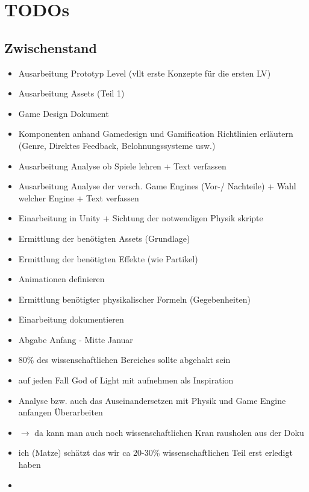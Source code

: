 \section{TODOs}

\subsection{Zwischenstand}
\begin{itemize}
\item Ausarbeitung Prototyp Level (vllt erste Konzepte für die ersten LV)
\item Ausarbeitung Assets (Teil 1)
\item Game Design Dokument
\item Komponenten anhand Gamedesign und Gamification Richtlinien erläutern (Genre, Direktes Feedback, Belohnungssysteme usw.)
\item Ausarbeitung Analyse ob Spiele lehren + Text verfassen
\item Ausarbeitung Analyse der versch. Game Engines (Vor-/ Nachteile) + Wahl welcher Engine + Text verfassen

\item Einarbeitung in Unity + Sichtung der notwendigen Physik skripte
\item \circledmark\quad Ermittlung der benötigten Assets (Grundlage)
\item Ermittlung der benötigten Effekte (wie Partikel)
\item Animationen definieren
\item Ermittlung benötigter physikalischer Formeln (Gegebenheiten)
\item Einarbeitung dokumentieren



\item Abgabe Anfang - Mitte Januar
\item 80\% des wissenschaftlichen Bereiches sollte abgehakt sein
\item auf jeden Fall God of Light mit aufnehmen als Inspiration
\item Analyse bzw. auch das Auseinandersetzen mit Physik und Game Engine anfangen Überarbeiten
\item $\rightarrow$ da kann man auch noch wissenschaftlichen Kran rausholen aus der Doku
\item ich (Matze) schätzt das wir ca 20-30\% wissenschaftlichen Teil erst erledigt haben
\item
\end{itemize}

